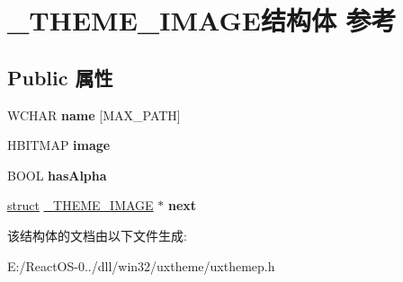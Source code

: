 \hypertarget{struct___t_h_e_m_e___i_m_a_g_e}{}\section{\+\_\+\+T\+H\+E\+M\+E\+\_\+\+I\+M\+A\+G\+E结构体 参考}
\label{struct___t_h_e_m_e___i_m_a_g_e}
\subsection*{Public 属性}
\begin{DoxyCompactItemize}
\item 
\mbox{\label{struct___t_h_e_m_e___i_m_a_g_e_a1ca9b6f10baebe6220f7a158b0f05f62}} 
W\+C\+H\+AR {\bfseries name} \mbox{[}M\+A\+X\+\_\+\+P\+A\+TH\mbox{]}
\item 
\mbox{\label{struct___t_h_e_m_e___i_m_a_g_e_a9892b2c7139a5ab2d68abc6f296920b7}} 
H\+B\+I\+T\+M\+AP {\bfseries image}
\item 
\mbox{\label{struct___t_h_e_m_e___i_m_a_g_e_a8489c186e1b0d696d88d028b1155ae60}} 
B\+O\+OL {\bfseries has\+Alpha}
\item 
\mbox{\label{struct___t_h_e_m_e___i_m_a_g_e_a095d5a63cd242011f83391016509e39a}} 
\hyperlink{interfacestruct}{struct} \hyperlink{struct___t_h_e_m_e___i_m_a_g_e}{\+\_\+\+T\+H\+E\+M\+E\+\_\+\+I\+M\+A\+GE} $\ast$ {\bfseries next}
\end{DoxyCompactItemize}


该结构体的文档由以下文件生成\+:\begin{DoxyCompactItemize}
\item 
E\+:/\+React\+O\+S-\/0../dll/win32/uxtheme/uxthemep.\+h\end{DoxyCompactItemize}
